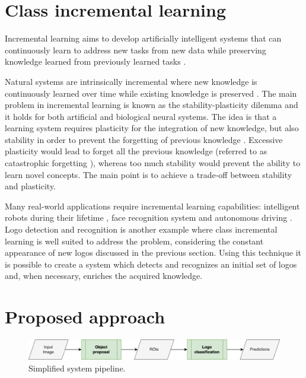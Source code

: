 \section{Class incremental learning}
Incremental learning aims to develop artificially intelligent
systems that can continuously learn to address new tasks
from new data while preserving knowledge learned from
previously learned tasks \cite{masana2020class}.

Natural systems are intrinsically incremental
where new knowledge is continuously learned over time
while existing knowledge is preserved \cite{wu2019large}. 
The main problem in incremental learning is known as the stability-plasticity dilemma and it holds for both artificial and biological neural systems. The idea is that a learning system requires plasticity for the integration of new knowledge, but also stability in order to prevent the forgetting of previous knowledge \cite{mermillod2013stability}. Excessive plasticity would lead to forget all the previous knowledge (referred to as catastrophic forgetting \cite{grossberg2013adaptive}), whereas too much stability would prevent the ability to learn novel concepts. The main point is to achieve a trade-off between stability and plasticity. 

Many real-world applications require incremental learning capabilities: intelligent robots during their lifetime \cite{thrun1995lifelong}, face recognition system \cite{li2017incremental} and autonomous driving \cite{pierre2018incremental}. Logo detection and recognition is another example where class incremental learning is well suited to address the problem, considering the constant appearance of new logos discussed in the previous section. Using this technique it is possible to create a system which detects and recognizes an initial set of logos and, when necessary, enriches the acquired knowledge.

\section{Proposed approach}

\begin{figure}
    \begin{center}
        \includegraphics[width=\columnwidth]{images/pipeline.drawio.png}
    \end{center}
    \caption{Simplified system pipeline.}
    \label{fig:system-pipeline}
\end{figure}



